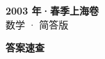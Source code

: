 \documentclass[zihao=-4, a4paper]{ctexart}
\begin{document}
\begin{center}
  {\Large\bfseries 2003 年·春季上海卷}\\[4pt]
  {\large 数学 · 简答版}
\end{center}
\medskip
{}

\clearpage
{}
\begin{center}{\Large\bfseries 答案速查}\end{center}
\medskip

\end{document}

